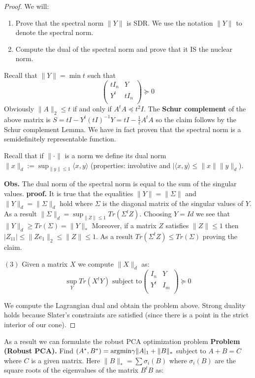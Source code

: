 \documentclass[12pt]{amsart}
\numberwithin{equation}{section}
\begin{document}
\begin{proof} We will:
\begin{enumerate}
\item Prove that the spectral norm $\|Y\|$ is SDR. We use the notation $\|Y\|$ to denote the spectral norm.
\item Compute the dual of the spectral norm and prove that it IS the nuclear norm. 
\end{enumerate}


Recall that $\|Y\|=\min t$ such that 
\[\left(
\begin{array}{cc}
tI_n & Y\\
Y^t & tI_n\\
\end{array}
\right)\succeq 0
\]
Obviously $\|A\|_2\leq t$ if and only if $A^tA\preceq t^2I$. The {\bf Schur complement} of the above matrix is $S=tI-Y^t(tI)^{-1}Y=tI-\frac{1}{t}A^tA$ so the claim follows by the Schur complement Lemma. We have in fact proven that the spectral norm is a semidefinitely representable function.


Recall that if $\|\cdot\|$ is a norm we define its dual norm $\|x\|_d:=\sup_{\|y\|\leq 1} \langle x,y\rangle$ (properties: involutive and $|\langle x,y\rangle\leq \|x\|\|y\|_d$). 

{\bf Obs.} The dual norm of the spectral norm is equal to the sum of the singular values.
{\bf proof.} It is true that the equalities $\|Y\|=\|\Sigma\|$ and $\|Y\|_d=\|\Sigma\|_d$ hold where $\Sigma$ is the diagonal matrix of the singular values of $Y$. As a result $\|\Sigma\|_d=\sup_{\|Z\|\leq 1} Tr(\Sigma^tZ)$. Choosing $Y=Id$ we see that $\|Y\|_d\geq Tr(\Sigma)=\|Y\|_*$ Moreover, if a matrix $Z$ satisfies $\|Z\|\leq 1$ then $|Z_{11}|\leq \|Ze_1\|_2\leq \|Z\|\leq 1$. As a result $Tr(\Sigma^tZ)\leq Tr(\Sigma)$ proving the claim.

$(3)$ Given a matrix $X$ we compute $\|X\|_d$ as:
\[\sup_Y Tr(X^tY) \text{ subject to}
\left(
\begin{array}{cc}
I_n & Y\\
Y^t & I_m\\
\end{array}
\right)\succeq 0
\] 

We compute the Lagrangian dual and obtain the problem above. Strong duality holds because Slater's constraints are satisfied (since there is a point in the strict interior of our cone). 
\end{proof}

As a result we can formulate the robust PCA optimization problem
{\bf Problem (Robust PCA).} Find $(A^*, B^*)={\rm argmin} \gamma \|A|_1+\|B\|_*$
subject to $A+B=C$ where $C$ is a given matrix. Here $\|B\|_*=\sum \sigma_i(B)$
where $\sigma_i(B)$ are the square roots of the eigenvalues of the matrix $B^tB$ as:
\end{document}
